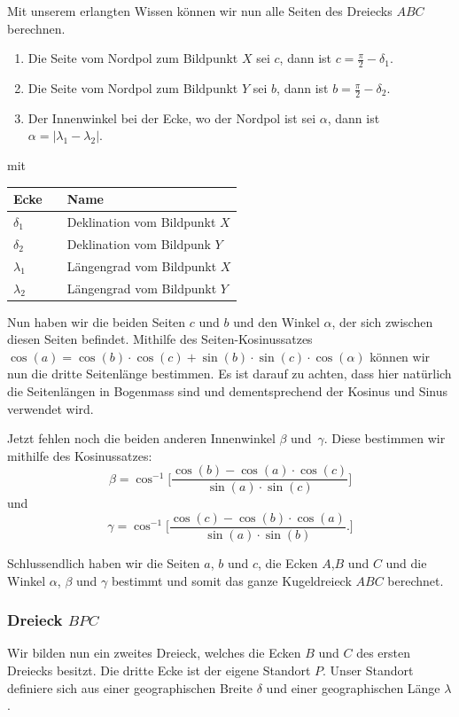 Mit unserem erlangten Wissen können wir nun alle Seiten des Dreiecks $ABC$ berechnen.

\begin{enumerate}
	\item Die Seite vom Nordpol zum Bildpunkt $X$ sei $c$, dann ist $c = \frac{\pi}{2} - \delta_1$.  
	\item Die Seite vom Nordpol zum Bildpunkt $Y$ sei $b$, dann ist $b = \frac{\pi}{2} - \delta_2$.
	\item Der Innenwinkel bei der Ecke, wo der Nordpol ist sei $\alpha$, dann ist $ \alpha = |\lambda_1 - \lambda_2|$.
\end{enumerate}

mit 
\begin{center}
	\begin{tabular}{ l l l }
		Ecke && Name  \\ 
		\hline
		$\delta_1$ && Deklination vom Bildpunkt $X$ \\  
		$\delta_2$ && Deklination vom Bildpunk $Y$ \\
		$\lambda_1 $&& Längengrad vom Bildpunkt $X$\\
		$\lambda_2$ && Längengrad vom Bildpunkt $Y$
	\end{tabular}
\end{center}

Nun haben wir die beiden Seiten $c$ und $b$ und den Winkel $\alpha$, der sich zwischen diesen Seiten befindet. 
Mithilfe des Seiten-Kosinussatzes 
$\cos(a) = \cos(b)\cdot \cos(c) + \sin(b) \cdot \sin(c)\cdot \cos(\alpha)$ 
können wir nun die dritte Seitenlänge bestimmen. 
Es ist darauf zu achten, dass hier natürlich die Seitenlängen in Bogenmass sind und dementsprechend der Kosinus und Sinus verwendet wird. 

Jetzt fehlen noch die beiden anderen Innenwinkel $\beta$ und\ $\gamma$.
Diese bestimmen wir mithilfe des Kosinussatzes: \[\beta=\cos^{-1}  \bigg[\frac{\cos(b)-\cos(a) \cdot \cos(c)}{\sin(a) \cdot \sin(c)}\bigg]\] und \[\gamma =  \cos^{-1}  \bigg[\frac{\cos(c)-\cos(b) \cdot \cos(a)}{\sin(a) \cdot \sin(b)}.\bigg]\]

Schlussendlich haben wir die Seiten $a$, $b$ und $c$, die Ecken $A$,$B$ und $C$ und die Winkel $\alpha$, $\beta$  und  $\gamma$ bestimmt und somit das ganze Kugeldreieck $ABC$ berechnet.

\subsubsection{Dreieck $BPC$}
Wir bilden nun ein zweites Dreieck, welches die Ecken $B$ und $C$ des ersten Dreiecks besitzt. 
Die dritte Ecke ist der eigene Standort $P$.
Unser Standort definiere sich aus einer geographischen Breite $\delta$ und einer geographischen Länge $\lambda$. 

